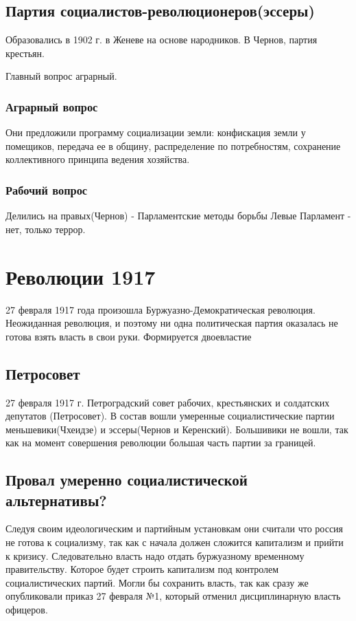 \documentclass[a4paper]{article}
\begin{document}
\subsection{Партия социалистов-революционеров(эссеры)}
Образовались в 1902 г. в Женеве на основе народников.
В Чернов, партия крестьян.

Главный вопрос аграрный.
\subsubsection{Аграрный вопрос}
Они предложили программу социализации земли: конфискация земли у помещиков, передача ее в общину, распределение по потребностям, сохранение коллективного принципа ведения хозяйства.

\subsubsection{Рабочий вопрос}

Делились на правых(Чернов) - Парламентские методы борьбы
Левые Парламент - нет, только террор.

\section{Революции 1917}
27 февраля 1917 года произошла Буржуазно-Демократическая революция.
Неожиданная революция, и поэтому ни одна политическая партия оказалась не готова взять власть в свои руки. Формируется двоевластие

\subsection{Петросовет} 27 февраля 1917 г. Петроградский совет рабочих, крестьянских и солдатских депутатов (Петросовет). В состав вошли умеренные социалистические партии меньшевики(Чхеидзе) и эссеры(Чернов и Керенский).
Большивики не вошли, так как на момент совершения революции большая часть партии за границей.

\subsection{Провал умеренно социалистической альтернативы?}
Следуя своим идеологическим и партийным установкам они считали что россия не готова к социализму, так как с начала должен сложится капитализм и прийти к кризису. Следовательно власть надо отдать буржуазному временному правительству. Которое будет строить капитализм под контролем социалистических партий.
Могли бы сохранить власть, так как сразу же опубликовали приказ 27 февраля №1, который отменил дисциплинарную власть офицеров.
\end{document}
